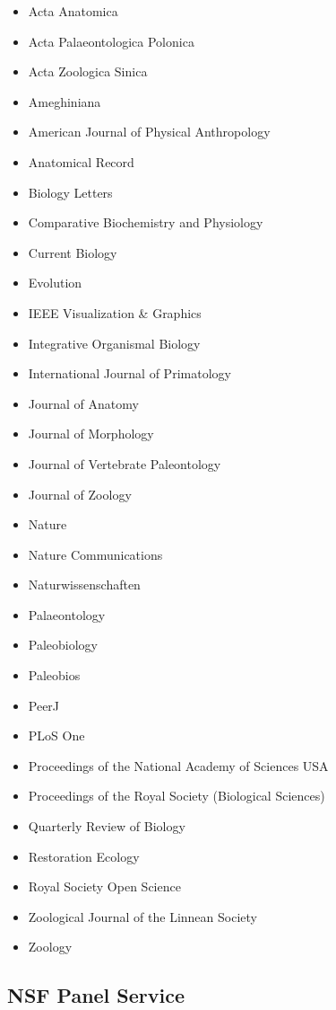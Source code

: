 \documentclass[10pt,letterpaper,]{article}
\providecommand{\tightlist}{%
  \setlength{\itemsep}{0pt}\setlength{\parskip}{0pt}}
\begin{document}
\begin{itemize}
\tightlist
\item
  Acta Anatomica
\item
  Acta Palaeontologica Polonica
\item
  Acta Zoologica Sinica
\item
  Ameghiniana
\item
  American Journal of Physical Anthropology
\item
  Anatomical Record
\item
  Biology Letters
\item
  Comparative Biochemistry and Physiology
\item
  Current Biology
\item
  Evolution
\item
  IEEE Visualization \& Graphics
\item
  Integrative Organismal Biology
\item
  International Journal of Primatology
\item
  Journal of Anatomy
\item
  Journal of Morphology
\item
  Journal of Vertebrate Paleontology
\item
  Journal of Zoology
\item
  Nature
\item
  Nature Communications
\item
  Naturwissenschaften
\item
  Palaeontology
\item
  Paleobiology
\item
  Paleobios
\item
  PeerJ
\item
  PLoS One
\item
  Proceedings of the National Academy of Sciences USA
\item
  Proceedings of the Royal Society (Biological Sciences)
\item
  Quarterly Review of Biology
\item
  Restoration Ecology
\item
  Royal Society Open Science
\item
  Zoological Journal of the Linnean Society
\item
  Zoology
\end{itemize}

\hypertarget{nsf-panel-service}{%
\subsection{NSF Panel Service}\label{nsf-panel-service}}
\end{document}
